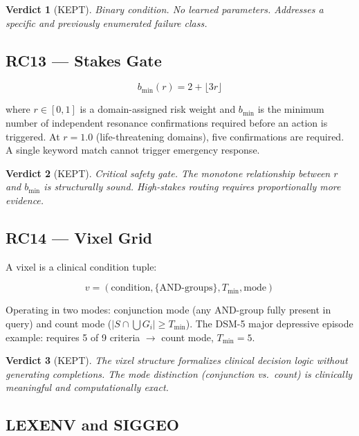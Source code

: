 \documentclass[11pt]{article}
\newtheorem{verdict}{Verdict}
\begin{document}
\begin{verdict}[\textcolor{keepgreen}{KEPT}]
Binary condition. No learned parameters. Addresses a specific and previously enumerated failure class.
\end{verdict}

\subsection{RC13 --- Stakes Gate}

\begin{equation}
  b_{\min}(r) = 2 + \lfloor 3r \rfloor
\end{equation}

where $r \in [0,1]$ is a domain-assigned risk weight and $b_{\min}$ is the minimum number of independent resonance confirmations required before an action is triggered. At $r = 1.0$ (life-threatening domains), five confirmations are required. A single keyword match cannot trigger emergency response.

\begin{verdict}[\textcolor{keepgreen}{KEPT}]
Critical safety gate. The monotone relationship between $r$ and $b_{\min}$ is structurally sound. High-stakes routing requires proportionally more evidence.
\end{verdict}

\subsection{RC14 --- Vixel Grid}

A vixel is a clinical condition tuple:

\begin{equation}
  v = (\text{condition}, \{\text{AND-groups}\}, T_{\min}, \text{mode})
\end{equation}

Operating in two modes: conjunction mode (any AND-group fully present in query) and count mode ($|S \cap \bigcup G_i| \geq T_{\min}$). The DSM-5 major depressive episode example: requires 5 of 9 criteria $\to$ count mode, $T_{\min} = 5$.

\begin{verdict}[\textcolor{keepgreen}{KEPT}]
The vixel structure formalizes clinical decision logic without generating completions. The mode distinction (conjunction vs.\ count) is clinically meaningful and computationally exact.
\end{verdict}

\subsection{LEXENV and SIGGEO}
\end{document}
